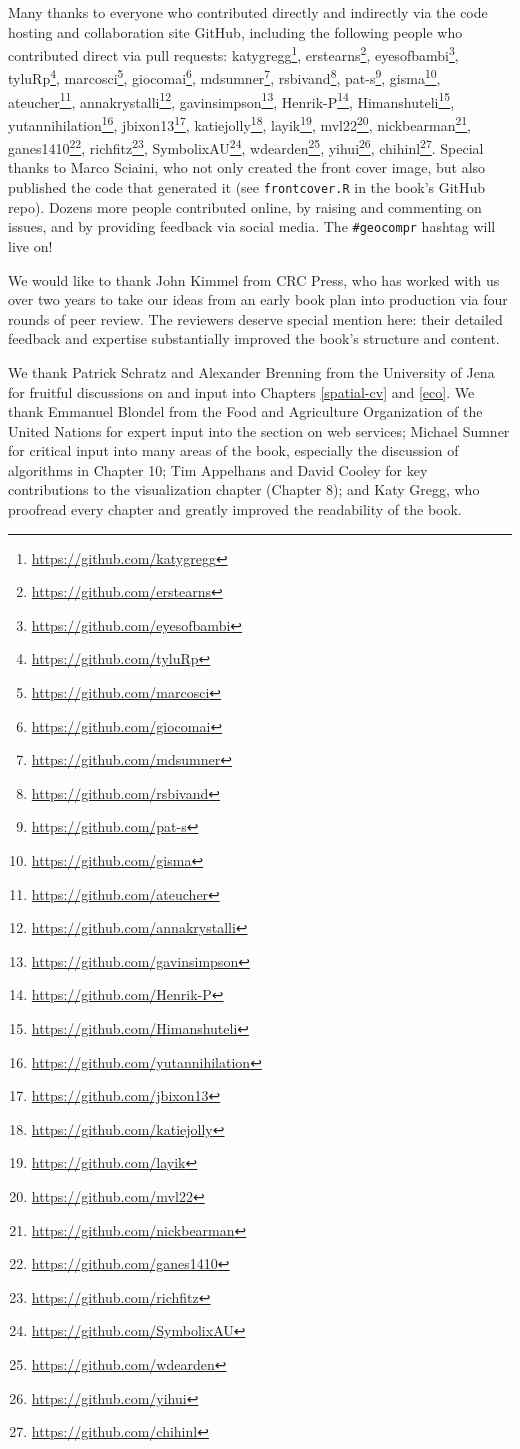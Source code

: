 \documentclass[]{krantz}
\let\rmarkdownfootnote\footnote%
\def\footnote{\protect\rmarkdownfootnote}
\renewcommand{\href}[2]{#2\footnote{\url{#1}}}
\begin{document}
Many thanks to everyone who contributed directly and indirectly via the code hosting and collaboration site GitHub, including the following people who contributed direct via pull requests: \href{https://github.com/katygregg}{katygregg}, \href{https://github.com/erstearns}{erstearns}, \href{https://github.com/eyesofbambi}{eyesofbambi}, \href{https://github.com/tyluRp}{tyluRp}, \href{https://github.com/marcosci}{marcosci}, \href{https://github.com/giocomai}{giocomai}, \href{https://github.com/mdsumner}{mdsumner}, \href{https://github.com/rsbivand}{rsbivand}, \href{https://github.com/pat-s}{pat-s}, \href{https://github.com/gisma}{gisma}, \href{https://github.com/ateucher}{ateucher}, \href{https://github.com/annakrystalli}{annakrystalli}, \href{https://github.com/gavinsimpson}{gavinsimpson}, \href{https://github.com/Henrik-P}{Henrik-P}, \href{https://github.com/Himanshuteli}{Himanshuteli}, \href{https://github.com/yutannihilation}{yutannihilation}, \href{https://github.com/jbixon13}{jbixon13}, \href{https://github.com/katiejolly}{katiejolly}, \href{https://github.com/layik}{layik}, \href{https://github.com/mvl22}{mvl22}, \href{https://github.com/nickbearman}{nickbearman}, \href{https://github.com/ganes1410}{ganes1410}, \href{https://github.com/richfitz}{richfitz}, \href{https://github.com/SymbolixAU}{SymbolixAU}, \href{https://github.com/wdearden}{wdearden}, \href{https://github.com/yihui}{yihui}, \href{https://github.com/chihinl}{chihinl}.
Special thanks to Marco Sciaini, who not only created the front cover image, but also published the code that generated it (see \texttt{frontcover.R} in the book's GitHub repo).
Dozens more people contributed online, by raising and commenting on issues, and by providing feedback via social media.
The \texttt{\#geocompr} hashtag will live on!

We would like to thank John Kimmel from CRC Press, who has worked with us over two years to take our ideas from an early book plan into production via four rounds of peer review.
The reviewers deserve special mention here: their detailed feedback and expertise substantially improved the book's structure and content.

We thank Patrick Schratz and Alexander Brenning from the University of Jena for fruitful discussions on and input into Chapters \ref{spatial-cv} and \ref{eco}.
We thank Emmanuel Blondel from the Food and Agriculture Organization of the United Nations for expert input into the section on web services;
Michael Sumner for critical input into many areas of the book, especially the discussion of algorithms in Chapter 10;
Tim Appelhans and David Cooley for key contributions to the visualization chapter (Chapter 8);
and Katy Gregg, who proofread every chapter and greatly improved the readability of the book.
\end{document}
